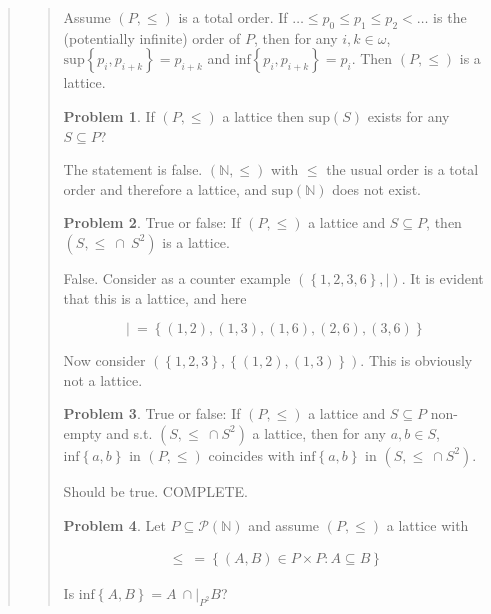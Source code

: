 \documentclass[a4paper, 12pt]{article}
\theoremstyle{definition}
\newtheorem{problem}{Problem}
\theoremstyle{definition}
\theoremstyle{definition}
\begin{document}
\begin{quote}
\begin{quote}
   Assume $(P, \leq) $ is a total order. If $\ldots \leq p_0 \leq p_1\leq  p_2 < \ldots$ 
   is the (potentially infinite) order of $P$, then for any 
   $i, k \in \omega$,  $\text{sup}\left\{ p_i, p_{i + k} \right\} = p _{i + k}$
   and $\text{inf}\left\{ p_i, p_{i +k} \right\} = p_i$. Then $(P, \leq) $ is a
   lattice.  

   \begin{problem}
       If $(P, \leq) $ a lattice then $\text{sup}(S)$ exists for any $S
       \subseteq P$?
   \end{problem}

   The statement is false. $(\mathbb{N}, \leq)$ with $\leq$ the usual order is a
   total order and therefore a lattice, and $\text{sup}(\mathbb{N}) $ does not
   exist.

   \begin{problem}
       True or false: If $(P, \leq) $ a lattice and $S \subseteq P$, then $(S,
       \leq ~ \cap ~ S^2)$ is a lattice.
   \end{problem}

   False. Consider as a counter example $(\left\{ 1, 2, 3, 6 \right\}, \mid )$.
   It is evident that this is a lattice, and here 

   $$\mid ~ = \left\{ (1, 2), (1,3), (1,6), (2, 6), (3, 6)\right\} $$

   Now consider $\left( \left\{ 1, 2, 3 \right\}, \left\{ (1, 2), (1, 3)
   \right\}   \right) $. This is obviously not a lattice.

\begin{problem}
    True or false: If $(P, \leq) $ a lattice and $S \subseteq P$ non-empty and
    s.t. $(S, \leq ~ \cap S^2)$ a lattice, then for any $a, b \in S$,
    $\text{inf}\left\{ a, b \right\} $ in $(P, \leq) $ coincides with
    $\text{inf}\left\{ a, b \right\} $ in $(S, \leq ~ \cap S^2)$.
\end{problem}

Should be true. COMPLETE.

\begin{problem}
    Let $P \subseteq \mathcal{P}(\mathbb{N})$ and assume $(P, \leq)$ a lattice
    with 

    \begin{align*}
        \leq ~ = \left\{ (A, B) \in P \times P : A \subseteq B \right\} 
    \end{align*}

    Is $\text{inf}\left\{ A, B \right\} = A ~ \cap |_{P^2} B $?
\end{problem}


\end{quote}
\end{quote}
\end{document}
